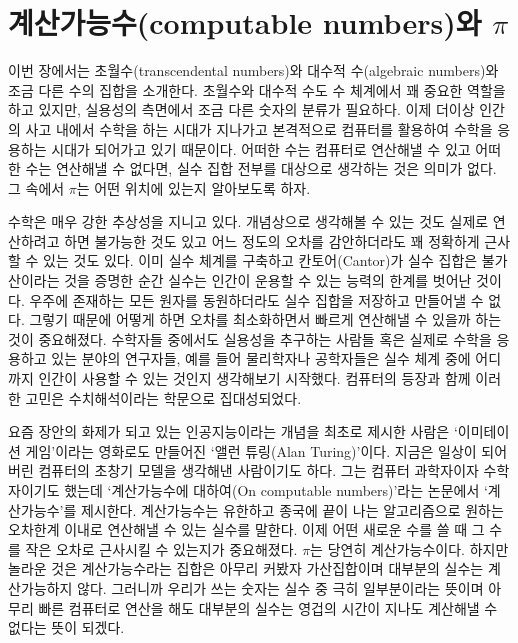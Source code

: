 \documentclass[10pt]{article}
\begin{document}
\section{계산가능수(computable numbers)와 $\pi$}
이번 장에서는 초월수(transcendental numbers)와 대수적 수(algebraic numbers)와 조금 다른 수의 집합을 소개한다. 초월수와 대수적 수도 수 체계에서 꽤 중요한 역할을 하고 있지만, 실용성의 측면에서 조금 다른 숫자의 분류가 필요하다. 이제 더이상 인간의 사고 내에서 수학을 하는 시대가 지나가고 본격적으로 컴퓨터를 활용하여 수학을 응용하는 시대가 되어가고 있기 때문이다. 어떠한 수는 컴퓨터로 연산해낼 수 있고 어떠한 수는 연산해낼 수 없다면, 실수 집합 전부를 대상으로 생각하는 것은 의미가 없다. 그 속에서 $\pi$는 어떤 위치에 있는지 알아보도록 하자. \par
수학은 매우 강한 추상성을 지니고 있다. 개념상으로 생각해볼 수 있는 것도 실제로 연산하려고 하면 불가능한 것도 있고 어느 정도의 오차를 감안하더라도 꽤 정확하게 근사할 수 있는 것도 있다. 이미 실수 체계를 구축하고 칸토어(Cantor)가 실수 집합은 불가산이라는 것을 증명한 순간 실수는 인간이 운용할 수 있는 능력의 한계를 벗어난 것이다. 우주에 존재하는 모든 원자를 동원하더라도 실수 집합을 저장하고 만들어낼 수 없다. 그렇기 때문에 어떻게 하면 오차를 최소화하면서 빠르게 연산해낼 수 있을까 하는 것이 중요해졌다. 수학자들 중에서도 실용성을 추구하는 사람들 혹은 실제로 수학을 응용하고 있는 분야의 연구자들, 예를 들어 물리학자나 공학자들은 실수 체계 중에 어디까지 인간이 사용할 수 있는 것인지 생각해보기 시작했다. 컴퓨터의 등장과 함께 이러한 고민은 수치해석이라는 학문으로 집대성되었다. \par
요즘 장안의 화제가 되고 있는 인공지능이라는 개념을 최초로 제시한 사람은 `이미테이션 게임'이라는 영화로도 만들어진 `앨런 튜링(Alan Turing)'이다. 지금은 일상이 되어버린 컴퓨터의 초창기 모델을 생각해낸 사람이기도 하다. 그는 컴퓨터 과학자이자 수학자이기도 했는데 `계산가능수에 대하여(On computable numbers)'라는 논문에서 `계산가능수'를 제시한다. 계산가능수는 유한하고 종국에 끝이 나는 알고리즘으로 원하는 오차한계 이내로 연산해낼 수 있는 실수를 말한다. 이제 어떤 새로운 수를 쓸 때 그 수를 작은 오차로 근사시킬 수 있는지가 중요해졌다. $\pi$는 당연히 계산가능수이다. 하지만 놀라운 것은 계산가능수라는 집합은 아무리 커봤자 가산집합이며 대부분의 실수는 계산가능하지 않다. 그러니까 우리가 쓰는 숫자는 실수 중 극히 일부분이라는 뜻이며 아무리 빠른 컴퓨터로 연산을 해도 대부분의 실수는 영겁의 시간이 지나도 계산해낼 수 없다는 뜻이 되겠다.
\end{document}
